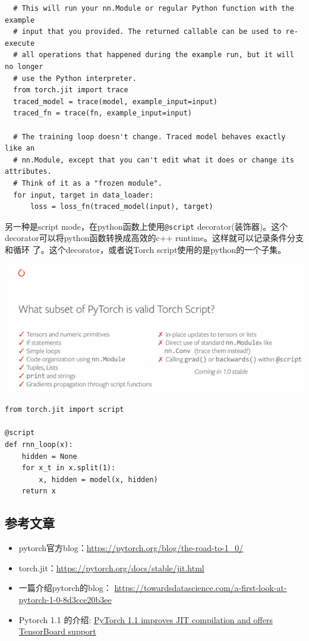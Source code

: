 \begin{lstlisting}
  # This will run your nn.Module or regular Python function with the example
  # input that you provided. The returned callable can be used to re-execute
  # all operations that happened during the example run, but it will no longer
  # use the Python interpreter.
  from torch.jit import trace
  traced_model = trace(model, example_input=input)
  traced_fn = trace(fn, example_input=input)

  # The training loop doesn't change. Traced model behaves exactly like an
  # nn.Module, except that you can't edit what it does or change its attributes.
  # Think of it as a "frozen module".
  for input, target in data_loader:
      loss = loss_fn(traced_model(input), target)
\end{lstlisting}

另一种是script mode，在python函数上使用\texttt{@script} decorator(装饰器)。这个
decorator可以将python函数转换成高效的c++ runtime。这样就可以记录条件分支和循环
了。这个decorator，或者说Torch script使用的是python的一个子集。

\includegraphics[width=0.8\linewidth]{pytorch/pic/torch_script.png}

\begin{lstlisting}
from torch.jit import script

@script
def rnn_loop(x):
    hidden = None
    for x_t in x.split(1):
        x, hidden = model(x, hidden)
    return x
\end{lstlisting}

\subsection{参考文章}

\begin{itemize}
\tightlist
\item
  pytorch官方blog：\url{https://pytorch.org/blog/the-road-to-1_0/}
\item
  torch.jit：\url{https://pytorch.org/docs/stable/jit.html}
\item
  一篇介绍pytorch的blog：
  \url{https://towardsdatascience.com/a-first-look-at-pytorch-1-0-8d3cce20b3ee}
\item Pytorch 1.1 的介绍: \href{https://jaxenter.com/pytorch-1-1-158332.html}
{PyTorch 1.1 improves JIT compilation and offers TensorBoard support}
\end{itemize}
